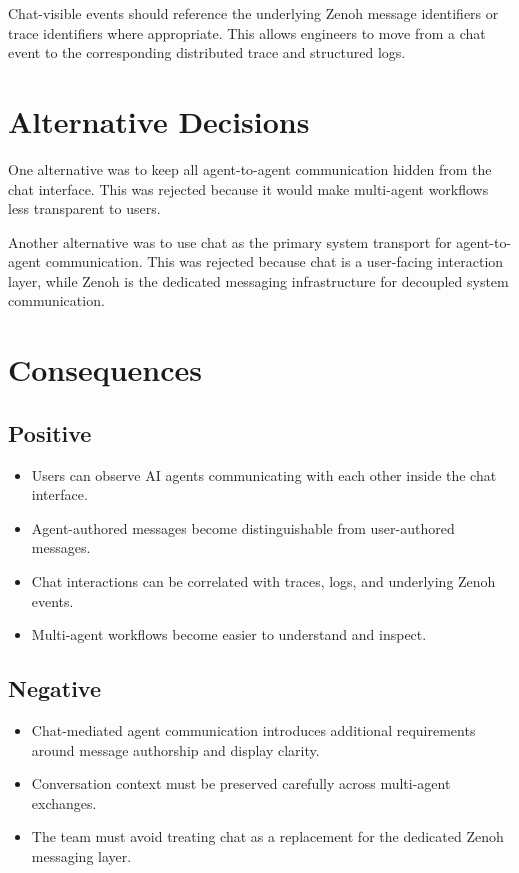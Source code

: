 \documentclass[11pt]{article}
\begin{document}
Chat-visible events should reference the underlying Zenoh message identifiers or trace identifiers where appropriate. This allows engineers to move from a chat event to the corresponding distributed trace and structured logs.

\section{Alternative Decisions}

One alternative was to keep all agent-to-agent communication hidden from the chat interface. This was rejected because it would make multi-agent workflows less transparent to users.

Another alternative was to use chat as the primary system transport for agent-to-agent communication. This was rejected because chat is a user-facing interaction layer, while Zenoh is the dedicated messaging infrastructure for decoupled system communication.

\section{Consequences}

\subsection{Positive}

\begin{itemize}
    \item Users can observe AI agents communicating with each other inside the chat interface.
    \item Agent-authored messages become distinguishable from user-authored messages.
    \item Chat interactions can be correlated with traces, logs, and underlying Zenoh events.
    \item Multi-agent workflows become easier to understand and inspect.
\end{itemize}

\subsection{Negative}

\begin{itemize}
    \item Chat-mediated agent communication introduces additional requirements around message authorship and display clarity.
    \item Conversation context must be preserved carefully across multi-agent exchanges.
    \item The team must avoid treating chat as a replacement for the dedicated Zenoh messaging layer.
\end{itemize}
\end{document}
